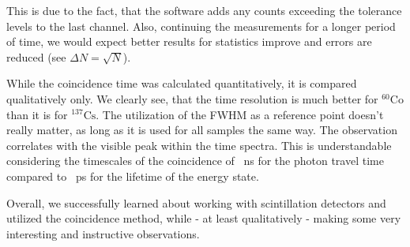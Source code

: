 This is due to the fact, that the software adds any counts exceeding the tolerance levels to the last channel.
Also, continuing the measurements for a longer period of time, we would expect better results for statistics improve and errors are reduced (see $\Delta N = \sqrt{N}$).
%
\par
%
While the coincidence time was calculated quantitatively, it is compared qualitatively only.
We clearly see, that the time resolution is much better for $^{60}\text{Co}$ than it is for $^{137}\text{Cs}$.
The utilization of the FWHM as a reference point doesn't really matter, as long as it is used for all samples the same way.
The observation correlates with the visible peak within the time spectra.
This is understandable considering the timescales of the coincidence of \SI{}{\nano\second} for the photon travel time compared to \SI{}{\pico\second} for the lifetime of the energy state.
%
\par
%
Overall, we successfully learned about working with scintillation detectors and utilized the coincidence method, while - at least qualitatively - making some very interesting and instructive observations.
